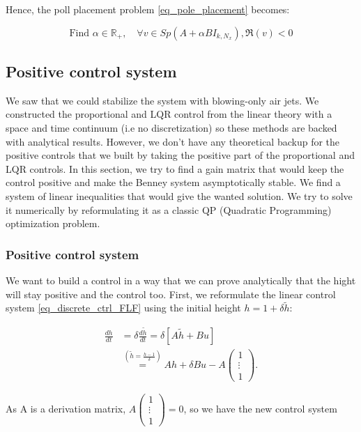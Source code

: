 \documentclass[12pt]{article}
\begin{document}
Hence, the poll placement problem \eqref{eq_pole_placement} becomes: 


\begin{equation}\label{eq_pole_placement}
\boxed{
    \text{Find }\alpha \in \mathbb{R}_+,  \quad \forall v \in Sp(A+\alpha BI_{k, N_x}), \mathfrak{R}(v) <0
    }
\end{equation}



\subsection{Positive control system}
We saw that we could stabilize the system with blowing-only air jets. We constructed the proportional and LQR control from the linear theory with a space and time continuum (i.e no discretization) so these methods are backed with analytical results. However, we don't have any theoretical backup for the positive controls that we built by taking the positive part of the proportional and LQR controls. In this section, we try to find a gain matrix that would keep the control positive and make the Benney system asymptotically stable. We find a system of linear inequalities that would give the wanted solution. We try to solve it numerically by reformulating it as a classic QP (Quadratic Programming) optimization problem.


\subsubsection{Positive control system}

We want to build a control in a way that we can prove analytically that the hight will stay positive and the control too. First, we reformulate the linear control system \eqref{eq_discrete_ctrl_FLF} using the initial height $h = 1 + \delta \tilde{h}$:

\begin{align}
    \frac{dh}{dt} &= \delta\frac{d\tilde{h}}{dt} = \delta \left[ A\tilde{h} + Bu\right] \\
    &\stackrel{(\tilde{h}=\frac{h-1}{\delta})}{=} Ah + \delta Bu - A \begin{pmatrix}
        1 \\ \vdots \\ 1
    \end{pmatrix} .
\end{align}

As A is a derivation matrix, 
$A \begin{pmatrix}
        1 \\ \vdots \\ 1
\end{pmatrix} =0$, so we have the new control system
\end{document}
